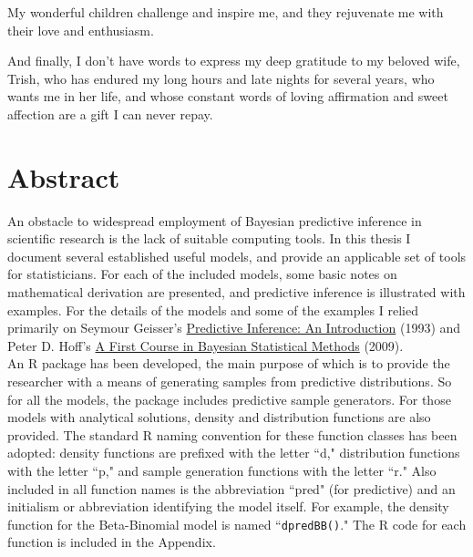 \documentclass[12pt, a4paper]{article}
\begin{document}
\noindent My wonderful children challenge and inspire me, and they rejuvenate me with their love and enthusiasm.

\vspace{1cm}

\noindent And finally, I don’t have words to express my deep gratitude to my beloved wife, Trish, who has endured my long hours and late nights for several years, who wants me in her life, and whose constant words of loving affirmation and sweet affection are a gift I can never repay.

\vspace{1cm}


\clearpage



\tableofcontents
\listoffigures
\newpage


\section{Abstract}

An obstacle to widespread employment of Bayesian predictive inference in scientific research is the lack of suitable computing tools.  In this thesis I document several established useful models, and provide an applicable set of tools for statisticians.  For each of the included models, some basic notes on mathematical derivation are presented, and predictive inference is illustrated with examples.  For the details of the models and some of the examples I relied primarily on Seymour Geisser's \underline{Predictive Inference:  An Introduction} (1993) and Peter D. Hoff's \underline{A First Course in Bayesian Statistical Methods} (2009).\\

\noindent An R package has been developed, the main purpose of which is to provide the researcher with a means of generating samples from predictive distributions.  So for all the models, the package includes predictive sample generators.  For those models with analytical solutions, density and distribution functions are also provided.  The standard R naming convention for these function classes has been adopted:  density functions are prefixed with the letter ``d," distribution functions with the letter ``p," and sample generation functions with the letter ``r."  Also included in all function names is the abbreviation ``pred" (for predictive) and an initialism or abbreviation identifying the model itself.  For example, the density function for the Beta-Binomial model is named ``\texttt{dpredBB()}."  The R code for each function is included in the Appendix.
\end{document}

